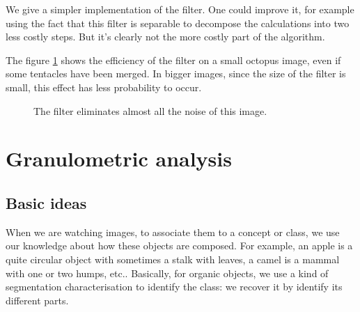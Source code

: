 We give a simpler implementation of the filter. One could improve it, for example using the fact that this filter is separable to decompose the calculations into two less costly steps. But it's clearly not the more costly part of the algorithm.

The figure \ref{filter-exp} shows the efficiency of the filter on a small octopus image, even if some tentacles have been merged. In bigger images, since the size of the filter is small, this effect has less probability to occur.

\begin{figure}[!ht]
    \centering
    \qquad\qquad\qquad
    \caption{The filter eliminates almost all the noise of this image.}
    \label{filter-exp}
\end{figure}	

\section{Granulometric analysis}

\subsection{Basic ideas}

When we are watching images, to associate them to a concept or class, we use our knowledge about how these objects are composed. For example, an apple is a quite circular object with sometimes a stalk with leaves, a camel is a mammal with one or two humps, etc.. Basically, for organic objects, we use a kind of segmentation characterisation to identify the class: we recover it by identify its different parts.

